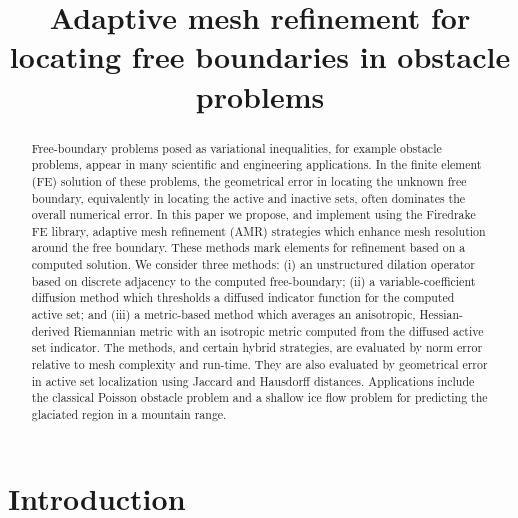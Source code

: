 \documentclass[]{interact}
\theoremstyle{plain}%
\theoremstyle{definition}
\theoremstyle{remark}
\begin{document}

\title{Adaptive mesh refinement for locating free boundaries in obstacle problems}

\author{
}

\maketitle

\begin{abstract}
Free-boundary problems posed as variational inequalities, for example obstacle problems, appear in many scientific and engineering applications.  In the finite element (FE) solution of these problems, the geometrical error in locating the unknown free boundary, equivalently in locating the active and inactive sets, often dominates the overall numerical error.  In this paper we propose, and implement using the Firedrake FE library, adaptive mesh refinement (AMR) strategies which enhance mesh resolution around the free boundary.  These methods mark elements for refinement based on a computed solution.  We consider three methods: (i) an unstructured dilation operator based on discrete adjacency to the computed free-boundary; (ii) a variable-coefficient diffusion method which thresholds a diffused indicator function for the computed active set; and (iii) a metric-based method which averages an anisotropic, Hessian-derived Riemannian metric with an isotropic metric computed from the diffused active set indicator.  The methods, and certain hybrid strategies, are evaluated by norm error relative to mesh complexity and run-time.  They are also evaluated by geometrical error in active set localization using Jaccard and Hausdorff distances.  Applications include the classical Poisson obstacle problem and a shallow ice flow problem for predicting the glaciated region in a mountain range.
\end{abstract}



\section{Introduction} \label{sec:intro}
\end{document}
